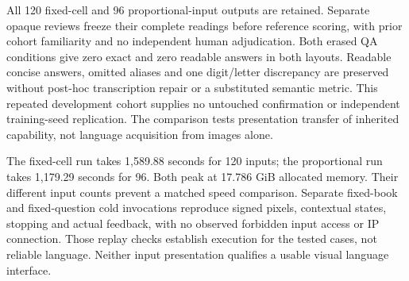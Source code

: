 \documentclass[12pt,a4paper]{article}
\providecommand{\DIFadd}[1]{{\protect\color{blue} \sf #1}} %
\begin{document}
\DIFadd{All 120 fixed-cell and 96 proportional-input outputs are retained. Separate
opaque reviews freeze their complete readings before reference scoring, with
prior cohort familiarity and no independent human adjudication. Both erased
QA conditions give zero exact and zero readable answers in both layouts.
Readable concise answers, omitted aliases and one digit/letter discrepancy
are preserved without post-hoc transcription repair or a substituted semantic
metric. This repeated development cohort supplies no untouched confirmation
or independent training-seed replication. The comparison tests presentation
transfer of inherited capability, not language acquisition from images alone.
}

\DIFadd{The fixed-cell run takes 1,589.88 seconds for 120 inputs; the proportional
run takes 1,179.29 seconds for 96. Both peak at 17.786 GiB allocated memory.
Their different input counts prevent a matched speed comparison. Separate
fixed-book and fixed-question cold invocations reproduce signed pixels,
contextual states, stopping and actual feedback, with no observed forbidden
input access or IP connection. Those replay checks establish execution for
the tested cases, not reliable language. Neither input presentation qualifies
a usable visual language interface.
}

\end{document}
